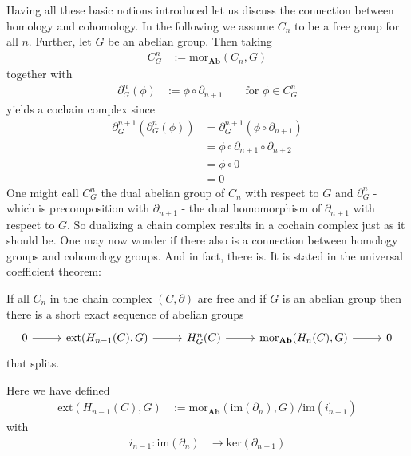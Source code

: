 Having all these basic notions introduced let us discuss the connection between homology and cohomology. In the following we assume $C_{n}$ to be a free group for all $n$. Further, let $G$ be an abelian group. Then taking
\begin{align*}
  C_{G}^{n}
  &:=
  \mathrm{mor}_{\mathbf{Ab}}(C_{n},G)
\end{align*}
together with
\begin{align*}
  \partial_{G}^{n}(\phi)
  &:=
  \phi
  \circ
  \partial_{n+1}
  \qquad
  \text{for }
  \phi
  \in
  C_{G}^{n}
\end{align*}
yields a cochain complex since
\begin{align*}
  \partial_{G}^{n+1}(\partial_{G}^{n}(\phi))
  &=
  \partial_{G}^{n+1}(\phi \circ \partial_{n+1})
  \\
  &=
  \phi
  \circ
  \partial_{n+1}
  \circ
  \partial_{n+2}
  \\
  &=
  \phi
  \circ
  0
  \\
  &=
  0
\end{align*}
One might call $C_{G}^{n}$ the dual abelian group of $C_{n}$ with respect to $G$ and $\partial_{G}^{n}$ - which is precomposition with $\partial_{n+1}$ - the dual homomorphism of $\partial_{n+1}$ with respect to $G$. So dualizing a chain complex results in a cochain complex just as it should be. One may now wonder if there also is a connection between homology groups and cohomology groups. And in fact, there is. It is stated in the universal coefficient theorem:
\\
\begin{thm}
\label{thm:uct}
If all $C_{n}$ in the chain complex $(C,\partial)$ are free and if $G$ is an abelian group then there is a short exact sequence of abelian groups
\begin{equation*}
\begin{tikzcd}[row sep=2.2em,column sep=2.6em]
  0
  \ar{r}
  &
  \mathrm{ext}(H_{n-1}(C),G)
  \ar{r}
  &
  H_{G}^{n}(C)
  \ar{r}
  &
  \mathrm{mor}_{\mathbf{Ab}}(H_{n}(C),G)
  \ar{r}
  &
  0
\end{tikzcd}
\end{equation*}
that splits.
\end{thm}
Here we have defined
\begin{align*}
  \mathrm{ext}(H_{n-1}(C),G)
  &:=
  \mathrm{mor}_{\mathbf{Ab}}(\mathrm{im}(\partial_{n}),G)
  /
  \mathrm{im}(i_{n-1}^{\prime})
\end{align*}
with
\begin{align*}
  i_{n-1}
  \colon
  \mathrm{im}(\partial_{n})
  &\to
  \mathrm{ker}(\partial_{n-1})
\end{align*}
